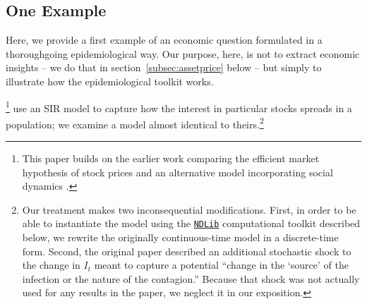 
\subsection{One Example}
\label{subsec:shillerpound}
\newcommand{\Recovered}{\mathsf{R}}
\newcommand{\recovered}{\mathsf{r}}

Here, we provide a first example of an economic question formulated in a thoroughgoing epidemiological way.  Our purpose, here, is not to extract economic insights -- we do that in section~{\ref{subsec:assetprice}} below -- but simply to illustrate how the epidemiological toolkit works.

\href{https://github.com/iworld1991/EpiExp/blob/master/Literature/shiller1989survey.pdf}{\cite{shiller1989survey}}\footnote{This paper builds on the earlier work comparing the efficient market hypothesis of stock prices and an alternative model incorporating social dynamics \href{https://github.com/iworld1991/EpiExp/blob/master/Literature/shiller1984stock.pdf}{\citep{shiller1984stock}}. } use an SIR model to capture how the interest in particular stocks spreads in a population; we examine a model almost identical to theirs.\footnote{Our treatment makes two inconsequential modifications.  First, in order to be able to instantiate the model using the \href{https://ndlib.readthedocs.io/en/latest/}{\texttt{NDLib}} computational toolkit described below, we rewrite the originally continuous-time model in a discrete-time form. Second, the original paper described an additional stochastic shock to the change in $I_t$ meant to capture a potential ``change in the `source' of the infection or the nature of the contagion.''  Because that shock was not actually used for any results in the paper, we neglect it in our exposition.}

